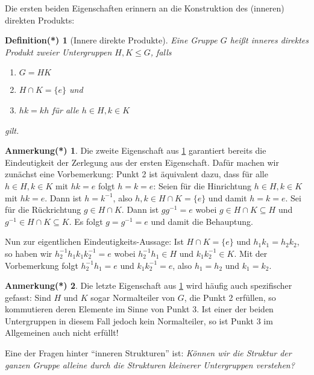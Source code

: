 \documentclass[a4paper, ngerman]{article}
\newcounter{chapter}
\numberwithin{equation}{chapter}
\theoremstyle{plain}
\newtheorem{definitionstrd}{Definition(*)}[chapter]
\theoremstyle{definition}
\newtheorem{annotationstrd}{Anmerkung(*)}[chapter]
\begin{document}
Die ersten beiden Eigenschaften erinnern an die Konstruktion des (inneren) direkten Produkts: 
\begin{definitionstrd}[Innere direkte Produkte]\label{def*:innere-direkte-produkte}
    Eine Gruppe \(G\) heißt \emph{inneres direktes Produkt} zweier Untergruppen \(H,K \leq G\), falls 
    \begin{enumerate}
        \item \(G = HK\)
        \item \(H \cap K = \{e\}\) und 
        \item \(hk = kh\) für alle \(h\in H, k \in K\)
    \end{enumerate}
    gilt. 
\end{definitionstrd}
\begin{annotationstrd}\label{ann*:eindeutige-zerlegung-innere-direkte-produkte}
    Die zweite Eigenschaft aus \cref{def*:innere-direkte-produkte} garantiert bereits die Eindeutigkeit der Zerlegung aus der ersten Eigenschaft. Dafür machen wir zunächst eine Vorbemerkung: Punkt 2 ist äquivalent dazu, dass für alle \(h\in H, k \in K\) mit \(hk = e\) folgt \(h = k = e\): Seien für die Hinrichtung \(h \in H, k \in K\) mit \(hk = e\). Dann ist \(h = k^{-1}\), also \(h, k \in H\cap K = \{e\}\) und damit \(h = k = e\).  Sei für die Rückrichtung \(g \in H\cap K\). Dann ist \(g g^{-1} = e\) wobei \(g \in H\cap K \subseteq H\) und \(g^{-1} \in H\cap K \subseteq K\). Es folgt \(g = g^{-1} = e\) und damit die Behauptung. 
    
    Nun zur eigentlichen Eindeutigkeits-Aussage: Ist \(H \cap K = \{e\}\) und \(h_1 k_1 = h_2 k_2\), so haben wir \(h_2^{-1} h_1 k_1 k_2^{-1} = e\) wobei \(h_2^{-1}h_1 \in H\) und \(k_1 k_2^{-1}\in K\). Mit der Vorbemerkung folgt \(h_2^{-1}h_1 = e\) und \(k_1 k_2^{-1} = e\), also \(h_1 = h_2\) und \(k_1 = k_2\). 
\end{annotationstrd}
\begin{annotationstrd}\label{ann*:innere-direkte-produkte-über-normalteiler}
    Die letzte Eigenschaft aus \cref{def*:innere-direkte-produkte} wird häufig auch spezifischer gefasst: Sind \(H\) und \(K\) sogar Normalteiler von \(G\), die Punkt 2 erfüllen, so kommutieren deren Elemente im Sinne von Punkt 3. Ist einer der beiden Untergruppen in diesem Fall jedoch kein Normalteiler, so ist Punkt 3 im Allgemeinen auch nicht erfüllt!
\end{annotationstrd}

Eine der Fragen hinter "`inneren Strukturen"' ist: \textit{Können wir die Struktur der ganzen Gruppe alleine durch die Strukturen kleinerer Untergruppen verstehen?}
\end{document}
